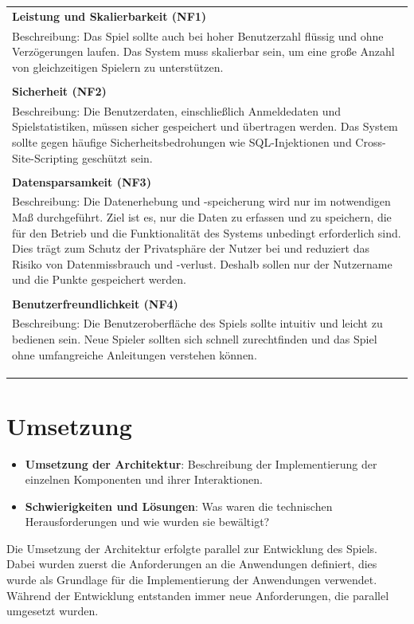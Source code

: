 \documentclass[
]{article}
\begin{document}
\begin{center}
  \begin{tabular}{|p{\linewidth}|}
    \hline
    \textbf{Leistung und Skalierbarkeit (NF1)} \\
    Beschreibung: Das Spiel sollte auch bei hoher Benutzerzahl flüssig und ohne Verzögerungen laufen. Das System muss skalierbar sein, um eine große Anzahl von gleichzeitigen Spielern zu unterstützen. \\ \\
    \hline
    \textbf{Sicherheit (NF2)} \\
    Beschreibung: Die Benutzerdaten, einschließlich Anmeldedaten und Spielstatistiken, müssen sicher gespeichert und übertragen werden. Das System sollte gegen häufige Sicherheitsbedrohungen wie SQL-Injektionen und Cross-Site-Scripting geschützt sein.\\ \\
    \hline
    \textbf{Datensparsamkeit (NF3)} \\
     Beschreibung:
     Die Datenerhebung und -speicherung wird nur im notwendigen Maß durchgeführt. 
     Ziel ist es, nur die Daten zu erfassen und zu speichern, die für den Betrieb und die Funktionalität des Systems unbedingt erforderlich sind. 
     Dies trägt zum Schutz der Privatsphäre der Nutzer bei und reduziert das Risiko von Datenmissbrauch und -verlust.
     Deshalb sollen nur der Nutzername und die Punkte gespeichert werden.
    \\ \\
    \hline
    \textbf{Benutzerfreundlichkeit (NF4)} \\
    Beschreibung: Die Benutzeroberfläche des Spiels sollte intuitiv und leicht zu bedienen sein. Neue Spieler sollten sich schnell zurechtfinden und das Spiel ohne umfangreiche Anleitungen verstehen können.\\ \\
    \\ \\
    \hline
  \end{tabular}
\end{center}

\section{Umsetzung}

\begin{itemize}
    \item \textbf{Umsetzung der Architektur}: Beschreibung der Implementierung der einzelnen Komponenten und ihrer Interaktionen.
    \item \textbf{Schwierigkeiten und Lösungen}: Was waren die technischen Herausforderungen und wie wurden sie bewältigt?
\end{itemize}
Die Umsetzung der Architektur erfolgte parallel zur Entwicklung des Spiels.
Dabei wurden zuerst die Anforderungen an die Anwendungen definiert, dies wurde als Grundlage
für die Implementierung der Anwendungen verwendet. Während der Entwicklung entstanden immer
neue Anforderungen, die parallel umgesetzt wurden.
\end{document}

